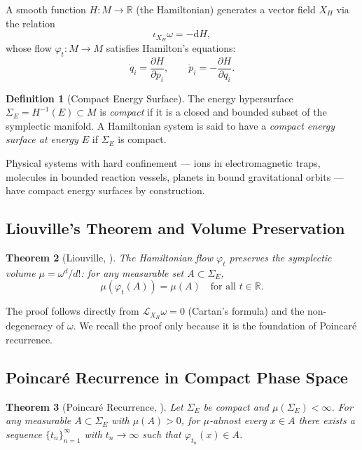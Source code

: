 \documentclass[twocolumn,10pt,a4paper]{article}
\theoremstyle{thmstyle}
\newtheorem{theorem}{Theorem}[section]
\theoremstyle{definition}
\newtheorem{definition}[theorem]{Definition}
\theoremstyle{remark}
\newcommand{\R}{\mathbb{R}}
\begin{document}
A smooth function $H: M \to \R$ (the Hamiltonian) generates a vector field $X_H$ via the relation
\begin{equation}
    \iota_{X_H} \omega = -\mathrm{d}H,
    \label{eq:ham-vf}
\end{equation}
whose flow $\varphi_t : M \to M$ satisfies Hamilton's equations:
\begin{equation}
    \dot{q}_i = \frac{\partial H}{\partial p_i}, \qquad \dot{p}_i = -\frac{\partial H}{\partial q_i}.
    \label{eq:hamilton}
\end{equation}

\begin{definition}[Compact Energy Surface]
The energy hypersurface $\Sigma_E = H^{-1}(E) \subset M$ is \emph{compact} if it is a closed and bounded subset of the symplectic manifold. A Hamiltonian system is said to have a \emph{compact energy surface at energy $E$} if $\Sigma_E$ is compact.
\end{definition}

Physical systems with hard confinement --- ions in electromagnetic traps, molecules in bounded reaction vessels, planets in bound gravitational orbits --- have compact energy surfaces by construction.

\subsection{Liouville's Theorem and Volume Preservation}

\begin{theorem}[Liouville, \citealp{liouville1838}]
\label{thm:liouville}
The Hamiltonian flow $\varphi_t$ preserves the symplectic volume $\mu = \omega^d / d!$: for any measurable set $A \subset \Sigma_E$,
\begin{equation}
    \mu(\varphi_t(A)) = \mu(A) \quad \text{for all } t \in \R.
\end{equation}
\end{theorem}

The proof follows directly from $\mathcal{L}_{X_H}\omega = 0$ (Cartan's formula) and the non-degeneracy of $\omega$. We recall the proof only because it is the foundation of Poincar\'e recurrence.

\subsection{Poincar\'e Recurrence in Compact Phase Space}

\begin{theorem}[Poincar\'e Recurrence, \citealp{poincare1890}]
\label{thm:poincare}
Let $\Sigma_E$ be compact and $\mu(\Sigma_E) < \infty$. For any measurable $A \subset \Sigma_E$ with $\mu(A) > 0$, for $\mu$-almost every $x \in A$ there exists a sequence $\{t_n\}_{n=1}^\infty$ with $t_n \to \infty$ such that $\varphi_{t_n}(x) \in A$.
\end{theorem}
\end{document}
